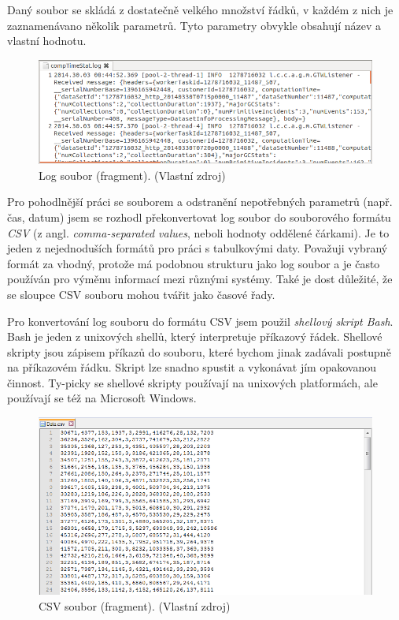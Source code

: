 \documentclass[a4paper,12pt,twoside]{scrreprt}
\begin{document}
Daný soubor se skládá z dostatečně velkého množství řádků, v každém z nich je zaznamenávano několik parametrů. Tyto parametry obvykle obsahují název a vlastní hodnotu. 

\begin{figure}[h]
  \centering
  \includegraphics[width=15cm]{pictures/log.png}
  \caption{Log soubor (fragment). (Vlastní zdroj)}
  \label{fig:log}
\end{figure}

Pro pohodlnější práci se souborem a odstranění nepotřebných parametrů (např. čas, datum) jsem se rozhodl překonvertovat log soubor do souborového formátu \textit{CSV} 	(z angl. \textit{comma-separated values}, neboli hodnoty oddělené čárkami). Je to jeden z nejednoduších formátů pro práci s tabulkovými daty. Považuji vybraný formát za vhodný, protože má podobnou strukturu jako log soubor a je často používán pro výměnu informací mezi různými systémy. Také je dost důležité, že se sloupce CSV souboru mohou tvářit jako časové řady.   

Pro konvertování log souboru do formátu CSV jsem použil \textit{shellový skript Bash}. Bash je jeden z unixových shellů, který interpretuje příkazový řádek. Shellové skripty jsou zápisem příkazů do souboru, které bychom jinak zadávali postupně na příkazovém řádku. Skript lze snadno spustit a vykonávat jím opakovanou činnost. Ty-picky se shellové skripty používají na unixových platformách, ale používají se též na Microsoft Windows.

\begin{figure}[h]
  \centering
  \includegraphics[width=15cm]{pictures/dataCsv.png}
  \caption{CSV soubor (fragment). (Vlastní zdroj)}
  \label{fig:csv}
\end{figure}
\end{document}
